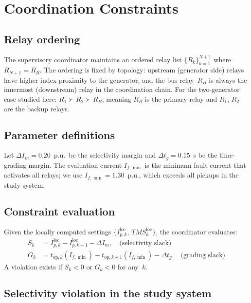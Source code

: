 \documentclass[journal,twoside,letterpaper]{IEEEtran}
\begin{document}
\section{Coordination Constraints}
\label{sec:constraints}

\subsection{Relay ordering}

The supervisory coordinator maintains an ordered relay list
$\{R_k\}_{k=1}^{N+1}$ where $R_{N+1} = R_B$.
The ordering is fixed by topology: upstream (generator side)
relays have higher index proximity to the generator, and the
bus relay~$R_B$ is always the innermost (downstream) relay in
the coordination chain.
For the two-generator case studied here:
$R_1 \succ R_2 \succ R_B$, meaning $R_B$ is the primary relay
and $R_1$, $R_2$ are the backup relays.

\subsection{Parameter definitions}

Let $\Delta I_m = 0.20$~p.u.\ be the selectivity margin and
$\Delta t_g = 0.15$~s be the time-grading margin.
The evaluation current $I_{f,\min}$ is the minimum fault
current that activates all relays; we use
$I_{f,\min} = 1.30$~p.u., which exceeds all pickups in the
study system.

\subsection{Constraint evaluation}

Given the locally computed settings
$\{I_{p,k}^{\mathrm{loc}},\,TMS_k^{\mathrm{loc}}\}$,
the coordinator evaluates:
\begin{align}
  S_k &= I_{p,k}^{\mathrm{loc}} - I_{p,k+1}^{\mathrm{loc}}
          - \Delta I_m, \quad
         \text{(selectivity slack)}\label{eq:sel_slack}\\
  G_k &= t_{\mathrm{op},k}(I_{f,\min})
        - t_{\mathrm{op},k+1}(I_{f,\min})
        - \Delta t_g.
         \quad \text{(grading slack)}\label{eq:grad_slack}
\end{align}
A violation exists if $S_k < 0$ or $G_k < 0$ for any~$k$.

\subsection{Selectivity violation in the study system}
\end{document}

